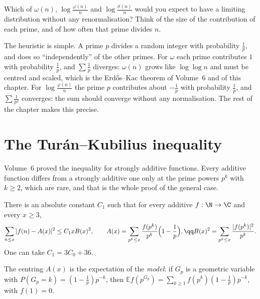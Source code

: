 \begin{think}
Which of $\omega(n)$, $\log\frac{\varphi(n)}n$ and $\log\frac{\sigma(n)}n$ would you expect to have a limiting distribution without any renormalisation? Think of the size of the contribution of each prime, and of how often that prime divides $n$.
\end{think}

The heuristic is simple. A prime $p$ divides a random integer with probability $\frac1p$, and does so ``independently'' of the other primes. For $\omega$ each prime contributes $1$ with probability $\frac1p$, and $\sum\frac1p$ diverges: $\omega(n)$ grows like $\log\log n$ and must be centred and scaled, which is the Erd\H{o}s--Kac theorem of Volume~6 and of this chapter. For $\log\frac{\varphi(n)}n$ the prime $p$ contributes about $-\frac1p$ with probability $\frac1p$, and $\sum\frac1{p^2}$ converges: the sum should converge without any normalisation. The rest of the chapter makes this precise.

\section{The Tur\'an--Kubilius inequality}

Volume~6 proved the inequality for strongly additive functions. Every additive function differs from a strongly additive one only at the prime powers $p^k$ with $k\ge2$, which are rare, and that is the whole proof of the general case.

\begin{theorem}\label{thm:tkgeneral}
There is an absolute constant $C_1$ such that for every additive $f:\N\to\C$ and every $x\ge3$,
\[
\sum_{n\le x}|f(n)-A(x)|^2\le C_1xB(x)^2,\qquad A(x)=\sum_{p^k\le x}\frac{f(p^k)}{p^k}\Bigl(1-\frac1p\Bigr),\qq B(x)^2=\sum_{p^k\le x}\frac{|f(p^k)|^2}{p^k}.
\]
One can take $C_1=3C_0+36$.
\end{theorem}

The centring $A(x)$ is the expectation of the \emph{model}: if $G_p$ is a geometric variable with $P(G_p=k)=(1-\frac1p)p^{-k}$, then $\mathbb E f(p^{G_p})=\sum_{k\ge1}f(p^k)(1-\frac1p)p^{-k}$, with $f(1)=0$.

